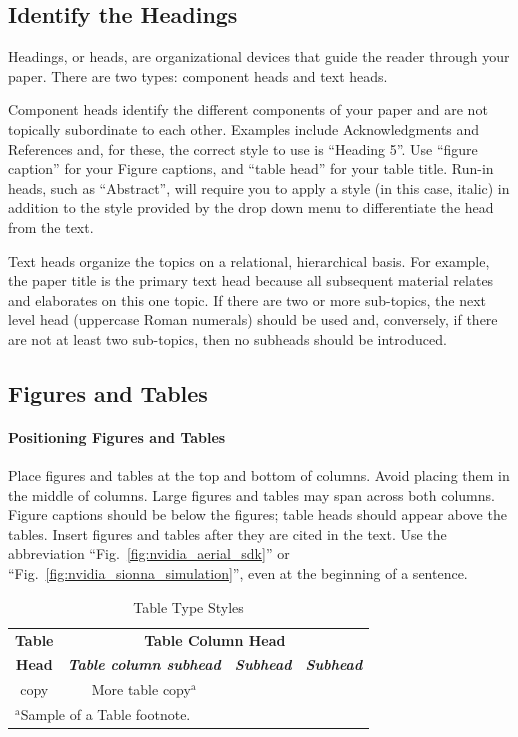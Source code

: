 \documentclass[conference]{IEEEtran}
\begin{document}
\subsection{Identify the Headings}
Headings, or heads, are organizational devices that guide the reader through 
your paper. There are two types: component heads and text heads.

Component heads identify the different components of your paper and are not 
topically subordinate to each other. Examples include Acknowledgments and 
References and, for these, the correct style to use is ``Heading 5''. Use 
``figure caption'' for your Figure captions, and ``table head'' for your 
table title. Run-in heads, such as ``Abstract'', will require you to apply a 
style (in this case, italic) in addition to the style provided by the drop 
down menu to differentiate the head from the text.

Text heads organize the topics on a relational, hierarchical basis. For 
example, the paper title is the primary text head because all subsequent 
material relates and elaborates on this one topic. If there are two or more 
sub-topics, the next level head (uppercase Roman numerals) should be used 
and, conversely, if there are not at least two sub-topics, then no subheads 
should be introduced.

\subsection{Figures and Tables}
\paragraph{Positioning Figures and Tables} Place figures and tables at the top and 
bottom of columns. Avoid placing them in the middle of columns. Large 
figures and tables may span across both columns. Figure captions should be 
below the figures; table heads should appear above the tables. Insert 
figures and tables after they are cited in the text. Use the abbreviation 
``Fig.~\ref{fig:nvidia_aerial_sdk}'' or ``Fig.~\ref{fig:nvidia_sionna_simulation}'', even at the beginning of a sentence.

\begin{table}[htbp]
\caption{Table Type Styles}
\begin{center}
\begin{tabular}{|c|c|c|c|}
\hline
\textbf{Table}&\multicolumn{3}{|c|}{\textbf{Table Column Head}} \\
\cline{2-4} 
\textbf{Head} & \textbf{\textit{Table column subhead}}& \textbf{\textit{Subhead}}& \textbf{\textit{Subhead}} \\
\hline
copy& More table copy$^{\mathrm{a}}$& &  \\
\hline
\multicolumn{4}{l}{$^{\mathrm{a}}$Sample of a Table footnote.}
\end{tabular}
\label{tab1}
\end{center}
\end{table}
\end{document}
